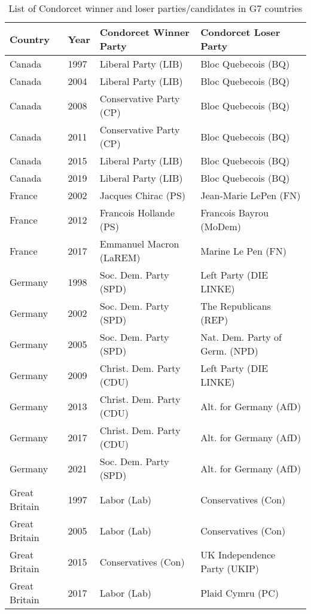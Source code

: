 \begin{table}
\caption{List of Condorcet winner and loser parties/candidates in G7 countries}
\footnotesize{
\begin{tabular}{llll} \toprule 
Country & Year & Condorcet Winner Party & Condorcet Loser Party \\ \midrule 
  Canada & 1997 &   Liberal Party (LIB) &   Bloc Quebecois (BQ)   \\ 
  Canada & 2004 &   Liberal Party (LIB) &   Bloc Quebecois (BQ)   \\ 
  Canada & 2008 &   Conservative Party (CP) &   Bloc Quebecois (BQ)   \\ 
  Canada & 2011 &   Conservative Party (CP) &   Bloc Quebecois (BQ)   \\ 
  Canada & 2015 &   Liberal Party (LIB) &   Bloc Quebecois (BQ)   \\ 
  Canada & 2019 &   Liberal Party (LIB) &   Bloc Quebecois (BQ)   \\  \midrule
 France & 2002 & Jacques Chirac (PS) & Jean-Marie LePen (FN)\\ 
 France & 2012 &   Francois Hollande (PS)   &   Francois Bayrou (MoDem)  \\ 
 France & 2017 &   Emmanuel Macron (LaREM)    &   Marine Le Pen (FN) \\ \midrule 
 Germany & 1998 &        Soc. Dem. Party (SPD) &   Left Party (DIE LINKE)   \\ 
  Germany & 2002 &        Soc. Dem. Party (SPD) &   The Republicans (REP) \\ 
  Germany & 2005 &        Soc. Dem. Party (SPD) &   Nat. Dem. Party of Germ. (NPD) \\ 
  Germany & 2009 &   Christ. Dem. Party (CDU) &   Left Party (DIE LINKE)   \\ 
  Germany & 2013 &   Christ. Dem. Party (CDU) &   Alt. for Germany (AfD) \\ 
  Germany & 2017 &   Christ. Dem. Party (CDU) &   Alt. for Germany (AfD) \\ 
  Germany & 2021 &        Soc. Dem. Party (SPD) &   Alt. for Germany (AfD) \\  \midrule 
 Great Britain & 1997 &   Labor (Lab) &   Conservatives (Con) \\ 
  Great Britain & 2005 &   Labor (Lab) &   Conservatives (Con) \\ 
  Great Britain & 2015 &   Conservatives (Con) &   UK Independence Party (UKIP) \\ 
  Great Britain & 2017 &   Labor (Lab) &   Plaid Cymru (PC)   \\ 

\end{tabular}}
\end{table}
